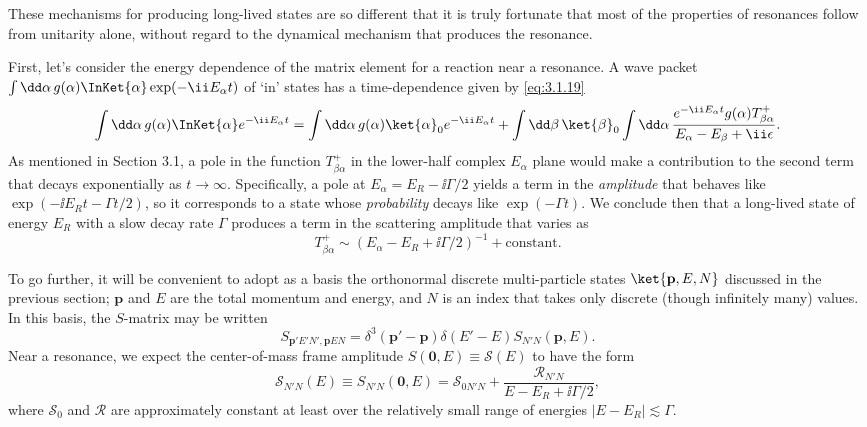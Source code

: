 These mechanisms for producing long-lived states are so different that it is
truly fortunate that most of the properties of resonances follow from
unitarity alone, without regard to the dynamical mechanism that produces the
resonance.

First, let's consider the energy dependence of the matrix element for a
reaction near a resonance. A wave packet
$\int \dd\alpha\,g(\alpha)\InKet{\alpha}\exp(-\ii E_\alpha t)$ of `in'
states has a time-dependence given by \eqref{eq:3.1.19}
\[
  \int \dd\alpha\,g(\alpha)\InKet{\alpha}e^{-\ii E_\alpha t}
  =\int \dd\alpha\,g(\alpha)\ket{\alpha}_0e^{-\ii E_\alpha t}
  +\int \dd\beta\,\ket{\beta}_0\int \dd\alpha\,
   \frac{e^{-\ii E_\alpha t}g(\alpha)T^+_{\beta\alpha}}
        {E_\alpha-E_\beta+\ii\epsilon}.
\]
As mentioned in Section 3.1, a pole in the function $T^+_{\beta\alpha}$ in
the lower-half complex $E_\alpha$ plane would make a contribution to the
second term that decays exponentially as $t\to\infty$. Specifically, a pole
at $E_\alpha=E_R-\ii\Gamma/2$ yields a term in the \emph{amplitude} that behaves
like $\exp(-\ii E_Rt-\Gamma t/2)$, so it corresponds to a state whose
\emph{probability} decays like $\exp(-\Gamma t)$. We conclude then that a
long-lived state of energy $E_R$ with a slow decay rate $\Gamma$ produces a
term in the scattering amplitude that varies as
\begin{equation}
  T^+_{\beta\alpha}\sim(E_\alpha-E_R+\ii\Gamma/2)^{-1}+\text{constant}.
  \tag{3.8.1}\label{eq:3.8.1}
\end{equation}

To go further, it will be convenient to adopt as a basis the orthonormal
discrete multi-particle states $\ket{\mathbf p,E,N}$ discussed in the previous
section; $\mathbf p$ and $E$ are the total momentum and energy, and $N$ is an
index that takes only discrete (though infinitely many) values. In this basis,
the $S$-matrix may be written
\begin{equation}
  S_{\mathbf p'E'N',\mathbf pEN}
  =\delta^3(\mathbf p'-\mathbf p)\delta(E'-E)S_{N'N}(\mathbf p,E).
  \tag{3.8.2}\label{eq:3.8.2}
\end{equation}
Near a resonance, we expect the center-of-mass frame amplitude
$S(\mathbf0,E)\equiv\mathcal S(E)$ to have the form
\begin{equation}
  \mathcal S_{N'N}(E)\equiv S_{N'N}(\mathbf0,E)
  =\mathcal S_{0N'N}+\frac{\mathcal R_{N'N}}{E-E_R+\ii\Gamma/2},
  \tag{3.8.3}\label{eq:3.8.3}
\end{equation}
where $\mathcal S_0$ and $\mathcal R$ are approximately constant at least over
the relatively small range of energies $|E-E_R|\lesssim\Gamma$.

